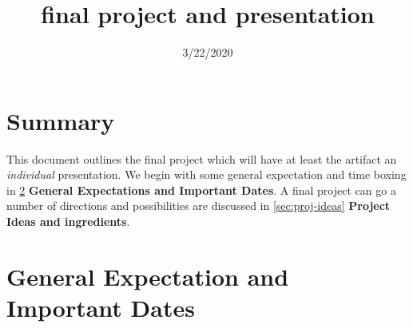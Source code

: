 \documentclass{article}
\title{{\sc final project and presentation}}
\date{3/22/2020}
\begin{document}
\maketitle
\section{Summary}
This document outlines the final project which will have at least the artifact an {\em individual} presentation.
We begin with some general expectation and time boxing in \ref{sec:import-dates} {\bf General Expectations and Important Dates}.
A final project can go a number of directions and possibilities are discussed in \ref{sec:proj-ideas} {\bf Project Ideas and ingredients}.

\section{General Expectation and Important Dates} \label{sec:import-dates}
\end{document}
